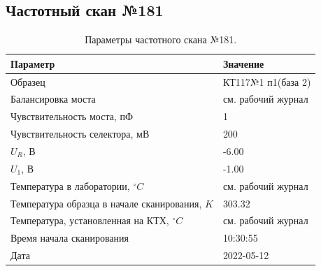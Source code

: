 \subsection{Частотный скан №181}
\begin{table}[!ht]
    \centering
    \caption{Параметры частотного скана №181.}
    \begin{tabular}{|l|l|}
        \hline
        Параметр                                       & Значение                  \\ \hline
        Образец                                        & КТ117№1 п1(база 2)        \\ \hline
        Балансировка моста                             & см. рабочий журнал        \\ \hline
        Чувствительность моста, пФ                     & 1                         \\ \hline
        Чувствительность селектора, мВ                 & 200                       \\ \hline
        $U_R$, В                                       & -6.00                     \\ \hline
        $U_1$, В                                       & -1.00                     \\ \hline
        Температура в лаборатории, $^\circ C$          & см. рабочий журнал        \\ \hline
        Температура образца в начале сканирования, $K$ & 303.32                    \\ \hline
        Температура, установленная на КТХ, $^\circ C$  & см. рабочий журнал        \\ \hline
        Время начала сканирования                      & 10:30:55                  \\ \hline
        Дата                                           & 2022-05-12                \\ \hline
    \end{tabular}
    \label{table:frequency_scan_181}
\end{table}

